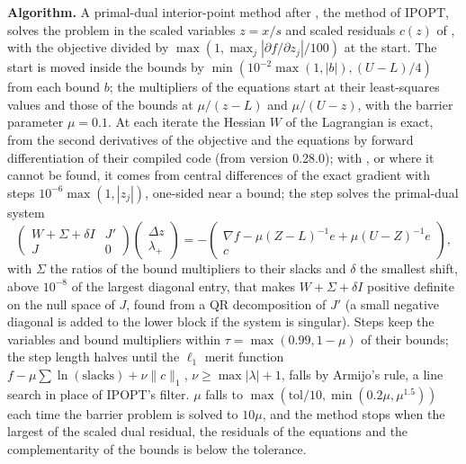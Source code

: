 \textbf{Algorithm.} A primal-dual interior-point method after
\citet{wachter2006}, the method of IPOPT, solves the problem in the scaled
variables $z = x/s$ and scaled residuals $c(z)$ of , with
the objective divided by $\max(1, \max_j |\partial f/\partial z_j| / 100)$
at the start. The start is moved inside the bounds by $\min(10^{-2}\max(1,
|b|), (U - L)/4)$ from each bound $b$; the multipliers of the equations
start at their least-squares values and those of the bounds at $\mu/(z - L)$
and $\mu/(U - z)$, with the barrier parameter $\mu = 0.1$. At each iterate
the Hessian $W$ of the Lagrangian is exact, from the second derivatives of
the objective and the equations by forward differentiation of their
compiled code (from version 0.28.0); with , or where it cannot be found, it comes from central
differences of the exact gradient with steps $10^{-6}\max(1, |z_j|)$,
one-sided near a bound; the
step solves the primal-dual system
\begin{equation*}
\begin{pmatrix} W + \Sigma + \delta I & J' \\ J & 0 \end{pmatrix}
\begin{pmatrix} \Delta z \\ \lambda_+ \end{pmatrix} =
-\begin{pmatrix} \nabla f - \mu (Z - L)^{-1} e + \mu (U - Z)^{-1} e \\ c
\end{pmatrix},
\end{equation*}
with $\Sigma$ the ratios of the bound multipliers to their slacks and
$\delta$ the smallest shift, above $10^{-8}$ of the largest diagonal entry,
that makes $W + \Sigma + \delta I$ positive definite on the null space of
$J$, found from a QR decomposition of $J'$ (a small negative diagonal is
added to the lower block if the system is singular). Steps keep the
variables and bound multipliers within $\tau = \max(0.99, 1 - \mu)$ of their
bounds; the step length halves until the $\ell_1$ merit function $f - \mu
\sum \ln(\text{slacks}) + \nu \lVert c \rVert_1$, $\nu \ge \max |\lambda| +
1$, falls by Armijo's rule, a line search in place of IPOPT's filter. $\mu$
falls to $\max(\text{tol}/10, \min(0.2\mu, \mu^{1.5}))$ each time the barrier
problem is solved to $10\mu$, and the method stops when the largest of the
scaled dual residual, the residuals of the equations and the complementarity
of the bounds is below the tolerance.

